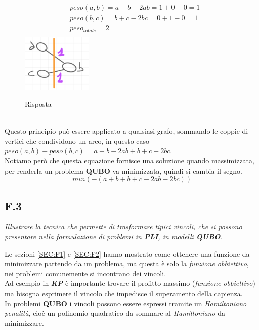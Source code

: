 \documentclass[a4paper]{article}
\newcommand{\imp}[1]{\textbf{\textit{#1}}}
\begin{document}
\begin{figure}[!ht]
                \centering
		\begin{align*}
                        & peso(a,b) = a + b -2ab = 1 + 0 - 0 = 1 \\
                        & peso(b,c) = b + c -2bc = 0 + 1 - 0 = 1 \\
                        & peso_{totale} = 2\\
                \end{align*}
                \includegraphics[width = 0.3\textwidth]{./img/F2_R.png}
                \caption{Risposta} \label{FIG:F2_true}
\end{figure}\\
Questo principio può essere applicato a qualsiasi grafo, sommando le coppie di vertici che condividono un arco, in questo caso $peso(a,b) + peso(b,c) = a +b -2ab +b +c -2bc$.\\
Notiamo però che questa equazione fornisce una soluzione quando massimizzata, per renderla un problema \textbf{QUBO} va minimizzata, quindi si cambia il segno.
$$ min(-(a + b + b + c - 2ab - 2 bc))$$
\subsection{F.3}
\label{SEC:F3}
\emph{Illustrare la tecnica che permette di trasformare tipici vincoli, che si possono presentare nella formulazione di problemi in \textbf{PLI}, in modelli \textbf{QUBO}.}


Le sezioni \ref{SEC:F1} e \ref{SEC:F2} hanno mostrato come ottenere una funzione da minimizzare partendo da un problema, ma questa è solo la \textit{funzione obbiettivo}, nei problemi comunemente si incontrano dei vincoli.\\
Ad esempio in \imp{KP} è importante trovare il profitto massimo (\textit{funzione obbiettivo}) ma bisogna esprimere il vincolo che impedisce il superamento della capienza.\\
In problemi \textbf{QUBO} i vincoli possono essere espressi tramite un \textit{Hamiltoniano penalità}, cioè un polinomio quadratico da sommare al \textit{Hamiltoniano} da minimizzare.
\end{document}
